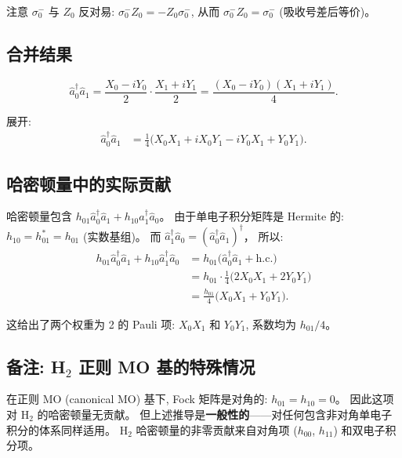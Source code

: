 \documentclass[fontset=mac]{ctexart}
\newcommand{\adag}[1]{\hat{a}_{#1}^\dagger}
\newcommand{\aop}[1]{\hat{a}_{#1}}
\newcommand{\Xop}{X}
\newcommand{\Yop}{Y}
\newcommand{\Zop}{Z}
\begin{document}
注意 $\sigma_0^-$ 与 $\Zop_0$ 反对易: $\sigma_0^- \Zop_0 = -\Zop_0 \sigma_0^-$,
从而 $\sigma_0^- \Zop_0 = \sigma_0^-$ (吸收号差后等价)。

\subsection*{合并结果}

\begin{equation}
    \adag{0} \aop{1} = \frac{\Xop_0 - i\Yop_0}{2} \cdot \frac{\Xop_1 + i\Yop_1}{2}
                      = \frac{(\Xop_0 - i\Yop_0)(\Xop_1 + i\Yop_1)}{4}.
\end{equation}

展开:
\begin{align}
    \adag{0} \aop{1} &= \frac{1}{4}\bigl(
        \Xop_0\Xop_1 + i\Xop_0\Yop_1 - i\Yop_0\Xop_1 + \Yop_0\Yop_1
    \bigr).
\end{align}

\subsection*{哈密顿量中的实际贡献}

哈密顿量包含 $h_{01}\adag{0}\aop{1} + h_{10}\adag{1}\aop{0}$。
由于单电子积分矩阵是 Hermite 的: $h_{10} = h_{01}^* = h_{01}$ (实数基组)。
而 $\adag{1}\aop{0} = (\adag{0}\aop{1})^\dagger$，
所以:
\begin{align}
    h_{01}\adag{0}\aop{1} + h_{10}\adag{1}\aop{0}
    &= h_{01}\bigl(\adag{0}\aop{1} + \text{h.c.}\bigr) \nonumber \\
    &= h_{01} \cdot \frac{1}{4}\bigl(
        2\Xop_0\Xop_1 + 2\Yop_0\Yop_1
       \bigr) \nonumber \\
    &= \frac{h_{01}}{4}\bigl(\Xop_0\Xop_1 + \Yop_0\Yop_1\bigr).
\end{align}

这给出了两个权重为 2 的 Pauli 项: $\Xop_0\Xop_1$ 和 $\Yop_0\Yop_1$, 系数均为 $h_{01}/4$。

\subsection*{备注: H$_2$ 正则 MO 基的特殊情况}

在正则 MO (canonical MO) 基下, Fock 矩阵是对角的: $h_{01} = h_{10} = 0$。
因此这项对 H$_2$ 的哈密顿量无贡献。
但上述推导是\textbf{一般性的}——对任何包含非对角单电子积分的体系同样适用。
H$_2$ 哈密顿量的非零贡献来自对角项 ($h_{00}$, $h_{11}$) 和双电子积分项。
\end{document}
